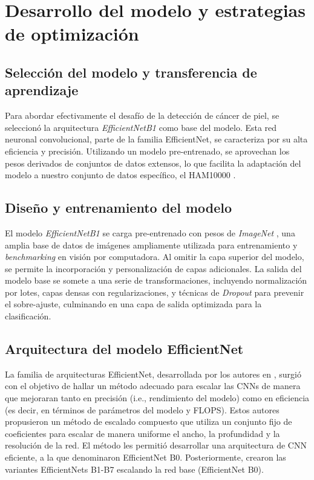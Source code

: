 \section{Desarrollo del modelo y estrategias de optimización}\label{sec:method}

\subsection{Selección del modelo y transferencia de aprendizaje}

Para abordar efectivamente el desafío de la detección de cáncer de piel, se seleccionó la arquitectura \textit{EfficientNetB1}  como base del modelo. Esta red neuronal convolucional, parte de la familia EfficientNet, se caracteriza por su alta eficiencia y precisión. Utilizando un modelo pre-entrenado, se aprovechan los pesos derivados de conjuntos de datos extensos, lo que facilita la adaptación del modelo a nuestro conjunto de datos específico, el HAM10000 .

\subsection{Diseño y entrenamiento del modelo}

El modelo \textit{EfficientNetB1} se carga pre-entrenado con pesos de \textit{ImageNet} , una amplia base de datos de imágenes ampliamente utilizada para entrenamiento y \textit{benchmarking} en visión por computadora. Al omitir la capa superior del modelo, se permite la incorporación y personalización de capas adicionales. La salida del modelo base se somete a una serie de transformaciones, incluyendo normalización por lotes, capas densas con regularizaciones, y técnicas de \textit{Dropout} para prevenir el sobre-ajuste, culminando en una capa de salida optimizada para la clasificación.

\subsection{Arquitectura del modelo EfficientNet}
   
La familia de arquitecturas EfficientNet, desarrollada por los autores en , surgió con el objetivo de hallar un método adecuado para escalar las CNNs de manera que mejoraran tanto en precisión (i.e., rendimiento del modelo) como en eficiencia (es decir, en términos de parámetros del modelo y FLOPS). Estos autores propusieron un método de escalado compuesto que utiliza un conjunto fijo de coeficientes para escalar de manera uniforme el ancho, la profundidad y la resolución de la red. El método les permitió desarrollar una arquitectura de CNN eficiente, a la que denominaron EfficientNet B0. Posteriormente, crearon las variantes EfficientNets B1-B7 escalando la red base (EfficientNet B0).
   
